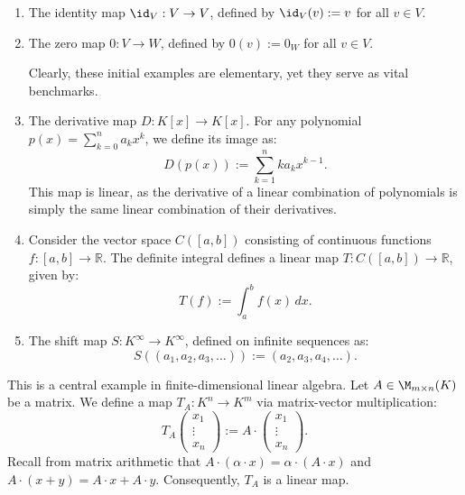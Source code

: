 \begin{example}
\label{ex:fundamental_linear_maps}
\begin{enumerate}
    \item The identity map $\id_V: V \to V$, defined by $\id_V(v) := v$ for all $v \in V$.
    \item The zero map $0: V \to W$, defined by $0(v) := 0_W$ for all $v \in V$. 
    
    Clearly, these initial examples are elementary, yet they serve as vital benchmarks.
    
    \item The derivative map $D: K[x] \to K[x]$. For any polynomial $p(x) = \sum_{k=0}^n a_k x^k$, we define its image as:
    \[
    D(p(x)) := \sum_{k=1}^n k a_k x^{k-1}.
    \]
    This map is linear, as the derivative of a linear combination of polynomials is simply the same linear combination of their derivatives.
    
    \item Consider the vector space $C([a, b])$ consisting of continuous functions $f: [a, b] \to \mathbb{R}$. The definite integral defines a linear map $T: C([a, b]) \to \mathbb{R}$, given by:
    \[
    T(f) := \int_a^b f(x) \, dx.
    \]
    
    \item The shift map $S: K^\infty \to K^\infty$, defined on infinite sequences as:
    \[
    S((a_1, a_2, a_3, \dots)) := (a_2, a_3, a_4, \dots).
    \]
\end{enumerate}
\end{example}

\begin{example}
\label{ex:matrix_transformation}
This is a central example in finite-dimensional linear algebra. Let $A \in \M_{m \times n}(K)$ be a matrix. We define a map $T_A: K^n \to K^m$ via matrix-vector multiplication:
\[
T_A \left(\begin{smallmatrix} x_1 \\ \vdots \\ x_n \end{smallmatrix}\right) := A \cdot \left(\begin{smallmatrix} x_1 \\ \vdots \\ x_n \end{smallmatrix}\right).
\]
Recall from matrix arithmetic that $A \cdot (\alpha \cdot x) = \alpha \cdot (A \cdot x)$ and $A \cdot (x + y) = A \cdot x + A \cdot y$. Consequently, $T_A$ is a linear map.
\end{example}

